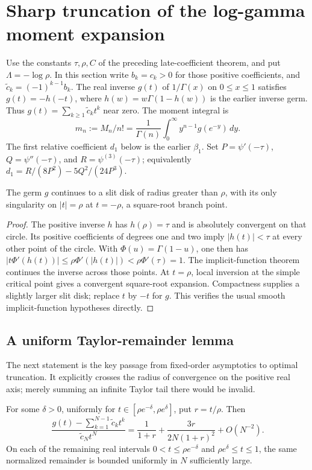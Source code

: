 \section{Sharp truncation of the log-gamma moment expansion}
Use the constants $\tau,\rho,C$ of the preceding late-coefficient theorem,
and put $\Lambda=-\log\rho$. In this section write $b_k=c_k>0$ for those
positive coefficients, and $\widetilde c_k=(-1)^{k-1}b_k$. The real inverse
$g(t)$ of $1/\Gamma(x)$ on $0\le x\le1$ satisfies $g(t)=-h(-t)$, where
$h(w)=w\Gamma(1-h(w))$ is the earlier inverse germ. Thus
$g(t)=\sum_{k\ge1}\widetilde c_k t^k$ near zero. The moment integral is
\[
 m_n:=M_n/n!=\frac1{\Gamma(n)}\int_0^\infty y^{n-1}g(e^{-y})\,dy.
\]
The first relative coefficient $d_1$ below is the earlier $\beta_1$.
Set $P=\psi'(-\tau)$, $Q=\psi''(-\tau)$, and $R=\psi^{(3)}(-\tau)$; equivalently
$d_1=R/(8P^2)-5Q^2/(24P^3)$.

\begin{lemma}\label{sharp:lem:slit}
The germ $g$ continues to a slit disk of radius greater than $\rho$,
with its only singularity on $|t|=\rho$ at $t=-\rho$, a square-root branch point.
\end{lemma}
\begin{proof}
The positive inverse $h$ has $h(\rho)=\tau$ and is absolutely convergent on
that circle. Its positive coefficients of degrees one and two imply
$|h(t)|<\tau$ at every other point of the circle. With
$\Phi(u)=\Gamma(1-u)$, one then has
$|t\Phi'(h(t))|\le\rho\Phi'(|h(t)|)<\rho\Phi'(\tau)=1$.
The implicit-function theorem continues the inverse across those points.
At $t=\rho$, local inversion at the simple critical point gives a convergent
square-root expansion. Compactness supplies a slightly larger slit disk;
replace $t$ by $-t$ for $g$. This verifies the usual smooth implicit-function
hypotheses directly.\cite{sharp:FS}
\end{proof}
\subsection{A uniform Taylor-remainder lemma}

The next statement is the key passage from fixed-order asymptotics to
optimal truncation. It explicitly crosses the radius of convergence on
the positive real axis; merely summing an infinite Taylor tail there
would be invalid.

\begin{lemma}\label{sharp:lem:inverse-remainder}
For some \(\delta>0\), uniformly for
\(t\in[\rho e^{-\delta},\rho e^\delta]\), put \(r=t/\rho\). Then
\begin{equation}\label{sharp:eq:inverse-remainder}
 \frac{g(t)-\sum_{k=1}^{N-1}\widetilde c_kt^k}{\widetilde c_Nt^N}
 =\frac1{1+r}+\frac{3r}{2N(1+r)^2}+O(N^{-2}).
\end{equation}
On each of the remaining real intervals
\(0<t\leq\rho e^{-\delta}\) and
\(\rho e^\delta\leq t\leq1\), the same normalized remainder is
bounded uniformly in \(N\) sufficiently large.
\end{lemma}

